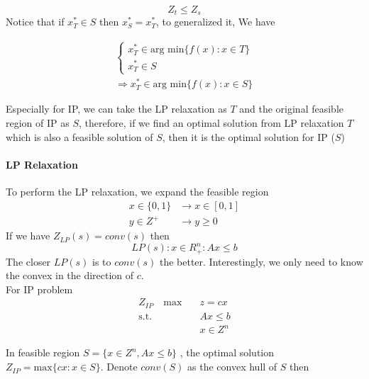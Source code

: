                 \begin{equation*}Z_t \le Z_s  \end{equation*}
                Notice that if $x_T^* \in S$ then $x_S^*=x_T^*$, to generalized it, We have

                \begin{align*}
                    \begin{cases}x_T^* \in \text{arg min} \{f(x): x\in T\} \\ x_T^* \in S\end{cases} \\ \Rightarrow x_T^*\in \text{arg min} \{f(x): x\in S\} 
                \end{align*}

                Especially for IP, we can take the LP relaxation as $T$ and the original feasible region of IP as $S$, therefore, if we find an optimal solution from LP relaxation $T$ which is also a feasible solution of $S$, then it is the optimal solution for IP ($S$)
                
            \paragraph{LP Relaxation}
                To perform the LP relaxation, we expand the feasible region
                \begin{align*}
                    x \in \{0,1\} & \rightarrow x\in [0, 1]  \\
                    y\in Z^+ & \rightarrow y \ge 0 
                \end{align*}
                If we have $Z_{LP}(s) = conv(s)$ then
                \begin{equation*} LP(s): {x\in R_+^n: Ax\le b}\end{equation*}
                The closer $LP(s)$ is to $conv(s)$ the better. Interestingly, we only need to know the convex in the direction of $c$.\\

                For IP problem
                \begin{align*}
                    Z_{IP} \quad \text{max} \quad &z = cx  \\
                            \text{s.t.} &Ax \le b \\
                                    &x\in {Z^n} 
                \end{align*}

                In feasible region $S = \{x\in Z^n, Ax\le b\}$ , the optimal solution $Z_{IP} = \text{max}\{cx: x\in S\}$. Denote $conv(S)$ as the convex hull of $S$ then

